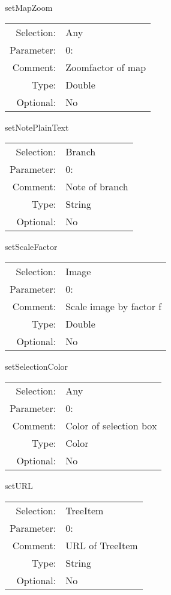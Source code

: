 \item setMapZoom\\
\begin{tabular}{rl}
  Selection: & Any\\
   Parameter: &  0:\\
        Comment: & Zoomfactor of map\\
           Type: & Double\\
       Optional: &  No\\
\end{tabular}

\item setNotePlainText\\
\begin{tabular}{rl}
  Selection: & Branch\\
   Parameter: &  0:\\
        Comment: & Note of branch\\
           Type: & String\\
       Optional: &  No\\
\end{tabular}

\item setScaleFactor\\
\begin{tabular}{rl}
  Selection: & Image\\
   Parameter: &  0:\\
        Comment: & Scale image by factor f\\
           Type: & Double\\
       Optional: &  No\\
\end{tabular}

\item setSelectionColor\\
\begin{tabular}{rl}
  Selection: & Any\\
   Parameter: &  0:\\
        Comment: & Color of selection box\\
           Type: & Color\\
       Optional: &  No\\
\end{tabular}

\item setURL\\
\begin{tabular}{rl}
  Selection: & TreeItem\\
   Parameter: &  0:\\
        Comment: & URL of TreeItem\\
           Type: & String\\
       Optional: &  No\\
\end{tabular}

